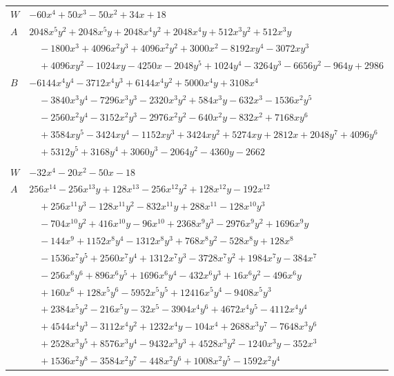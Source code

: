 \documentclass[11pt]{article}
\begin{document}
\begin{longtable}{@{}ll@{}}
$W$ & $-60x^{4}+50x^{3}-50x^{2}+34x+18$\\
$A$ & $2048x^{5}y^{2}+2048x^{5}y+2048x^{4}y^{2}+2048x^{4}y+512x^{3}y^{2}+512x^{3}y$\\
 & $\quad -1800x^{3}+4096x^{2}y^{3}+4096x^{2}y^{2}+3000x^{2}-8192xy^{4}-3072xy^{3}$\\
 & $\quad +4096xy^{2}-1024xy-4250x-2048y^{5}+1024y^{4}-3264y^{3}-6656y^{2}-964y+2986$\\
$B$ & $-6144x^{4}y^{4}-3712x^{4}y^{3}+6144x^{4}y^{2}+5000x^{4}y+3108x^{4}$\\
 & $\quad -3840x^{3}y^{4}-7296x^{3}y^{3}-2320x^{3}y^{2}+584x^{3}y-632x^{3}-1536x^{2}y^{5}$\\
 & $\quad -2560x^{2}y^{4}-3152x^{2}y^{3}-2976x^{2}y^{2}-640x^{2}y-832x^{2}+7168xy^{6}$\\
 & $\quad +3584xy^{5}-3424xy^{4}-1152xy^{3}+3424xy^{2}+5274xy+2812x+2048y^{7}+4096y^{6}$\\
 & $\quad +5312y^{5}+3168y^{4}+3060y^{3}-2064y^{2}-4360y-2662$\\
\addlinespace[3pt]
\multicolumn{2}{@{}l}{$i=4$, $m=1$, neighbours $2,8,14,17,19,25,32,34,38,39,40$}\\
$W$ & $-32x^{4}-20x^{2}-50x-18$\\
$A$ & $256x^{14}-256x^{13}y+128x^{13}-256x^{12}y^{2}+128x^{12}y-192x^{12}$\\
 & $\quad +256x^{11}y^{3}-128x^{11}y^{2}-832x^{11}y+288x^{11}-128x^{10}y^{3}$\\
 & $\quad -704x^{10}y^{2}+416x^{10}y-96x^{10}+2368x^{9}y^{3}-2976x^{9}y^{2}+1696x^{9}y$\\
 & $\quad -144x^{9}+1152x^{8}y^{4}-1312x^{8}y^{3}+768x^{8}y^{2}-528x^{8}y+128x^{8}$\\
 & $\quad -1536x^{7}y^{5}+2560x^{7}y^{4}+1312x^{7}y^{3}-3728x^{7}y^{2}+1984x^{7}y-384x^{7}$\\
 & $\quad -256x^{6}y^{6}+896x^{6}y^{5}+1696x^{6}y^{4}-432x^{6}y^{3}+16x^{6}y^{2}-496x^{6}y$\\
 & $\quad +160x^{6}+128x^{5}y^{6}-5952x^{5}y^{5}+12416x^{5}y^{4}-9408x^{5}y^{3}$\\
 & $\quad +2384x^{5}y^{2}-216x^{5}y-32x^{5}-3904x^{4}y^{6}+4672x^{4}y^{5}-4112x^{4}y^{4}$\\
 & $\quad +4544x^{4}y^{3}-3112x^{4}y^{2}+1232x^{4}y-104x^{4}+2688x^{3}y^{7}-7648x^{3}y^{6}$\\
 & $\quad +2528x^{3}y^{5}+8576x^{3}y^{4}-9432x^{3}y^{3}+4528x^{3}y^{2}-1240x^{3}y-352x^{3}$\\
 & $\quad +1536x^{2}y^{8}-3584x^{2}y^{7}-448x^{2}y^{6}+1008x^{2}y^{5}-1592x^{2}y^{4}$\\

\end{longtable}
\end{document}
